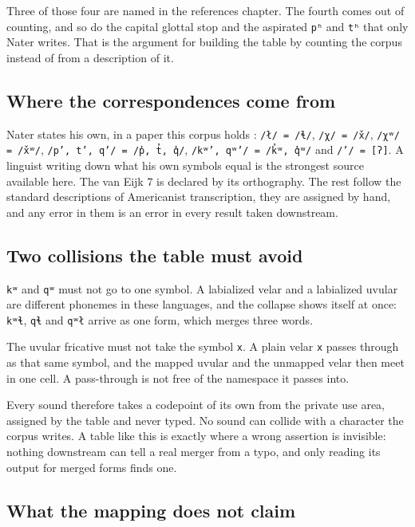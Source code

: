 Three of those four are named in the references chapter. The fourth comes out of counting, and so
do the capital glottal stop and the aspirated \texttt{pʰ} and \texttt{tʰ} that only Nater writes.
That is the argument for building the table by counting the corpus instead of from a description of
it.

\subsection{Where the correspondences come from}

Nater states his own, in a paper this corpus holds \cite{src:Nater-2024}: \texttt{/ł/ = /ɬ/},
\texttt{/χ/ = /x̌/}, \texttt{/χʷ/ = /x̌ʷ/}, \texttt{/p’, t’, q’/ = /p̓, t̓, q̓/},
\texttt{/kʷ’, qʷ’/ = /k̓ʷ, q̓ʷ/} and \texttt{/’/ = [ʔ]}. A linguist writing down what his own symbols
equal is the strongest source available here. The van Eijk 7 is declared by its orthography. The
rest follow the standard descriptions of Americanist transcription, they are assigned by hand, and
any error in them is an error in every result taken downstream.

\subsection{Two collisions the table must avoid}

\texttt{kʷ} and \texttt{qʷ} must not go to one symbol. A labialized velar and a labialized uvular
are different phonemes in these languages, and the collapse shows itself at once: \texttt{kʷɬ},
\texttt{qɬ} and \texttt{qʷł} arrive as one form, which merges three words.

The uvular fricative must not take the symbol \texttt{x}. A plain velar \texttt{x} passes through as
that same symbol, and the mapped uvular and the unmapped velar then meet in one cell. A pass-through
is not free of the namespace it passes into.

Every sound therefore takes a codepoint of its own from the private use area, assigned by the table
and never typed. No sound can collide with a character the corpus writes. A table like this is exactly
where a wrong assertion is invisible: nothing downstream can tell a real merger from a typo, and
only reading its output for merged forms finds one.

\subsection{What the mapping does not claim}

